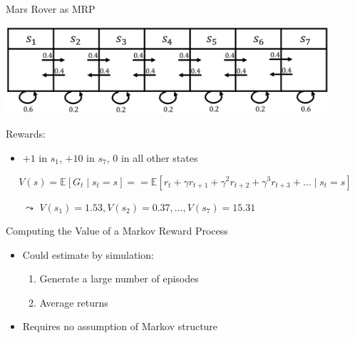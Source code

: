 \begin{frame}[c]{Mars Rover as MRP}
	
	\begin{center}
		\includegraphics[width=0.9\textwidth]{images/mars_rover_markov_process_2.png}
	\end{center}
	
	Rewards:
	\begin{itemize}
		\item $+1$ in $s_1$, $+10$ in $s_7$, $0$ in all other states
	\end{itemize}

$$ V(s)  = \mathbb{E}[G_t \mid s_t=s] == \mathbb{E}[r_t + \gamma r_{t+1} + \gamma^2 r_{t+2} + \gamma^3 r_{t+3} + \ldots \mid s_t = s]$$

	\begin{itemize}
		\item[$\leadsto$] $V(s_1) = 1.53, V(s_2) = 0.37, \ldots, V(s_7) = 15.31$
	\end{itemize}
	
\end{frame}
\begin{frame}[c]{Computing the Value of a Markov Reward Process}
	
	\begin{itemize}
		\item Could estimate by simulation:
		\begin{enumerate}
			\item Generate a large number of episodes
			\item Average returns
		\end{enumerate}
		\item Requires no assumption of Markov structure
	\end{itemize}
	
\end{frame}
